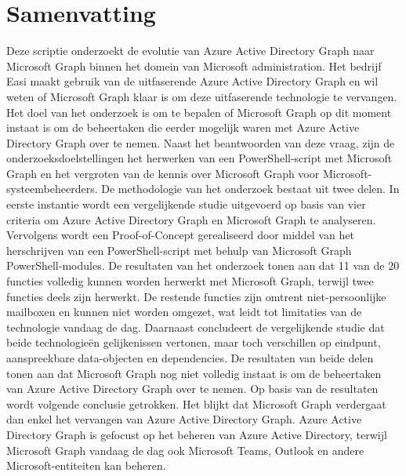 
%
%
%
%
\chapter*{Samenvatting}
Deze scriptie onderzoekt de evolutie van Azure Active Directory Graph naar Microsoft Graph binnen het domein van Microsoft administration. Het bedrijf Easi maakt gebruik van de uitfaserende Azure Active Directory Graph en wil weten of Microsoft Graph klaar is om deze uitfaserende technologie te vervangen. Het doel van het onderzoek is om te bepalen of Microsoft Graph op dit moment instaat is om de beheertaken die eerder mogelijk waren met Azure Active Directory Graph over te nemen. Naast het beantwoorden van deze vraag, zijn de onderzoeksdoelstellingen het herwerken van een PowerShell-script met Microsoft Graph en het vergroten van de kennis over Microsoft Graph voor Microsoft-systeembeheerders. De methodologie van het onderzoek bestaat uit twee delen. In eerste instantie wordt een vergelijkende studie uitgevoerd op basis van vier criteria om Azure Active Directory Graph en Microsoft Graph te analyseren. Vervolgens wordt een Proof-of-Concept gerealiseerd door middel van het herschrijven van een PowerShell-script met behulp van Microsoft Graph PowerShell-modules. De resultaten van het onderzoek tonen aan dat 11 van de 20 functies volledig kunnen worden herwerkt met Microsoft Graph, terwijl twee functies deels zijn herwerkt. De restende functies zijn omtrent niet-persoonlijke mailboxen en kunnen niet worden omgezet, wat leidt tot limitaties van de technologie vandaag de dag. Daarnaast concludeert de vergelijkende studie dat beide technologieën gelijkenissen vertonen, maar toch verschillen op eindpunt, aanspreekbare data-objecten en dependencies. De resultaten van beide delen tonen aan dat Microsoft Graph nog niet volledig instaat is om de beheertaken van Azure Active Directory Graph over te nemen. Op basis van de resultaten wordt volgende conclusie getrokken. Het blijkt dat Microsoft Graph verdergaat dan enkel het vervangen van Azure Active Directory Graph. Azure Active Directory Graph is gefocust op het beheren van Azure Active Directory, terwijl Microsoft Graph vandaag de dag ook Microsoft Teams, Outlook en andere Microsoft-entiteiten kan beheren. 


